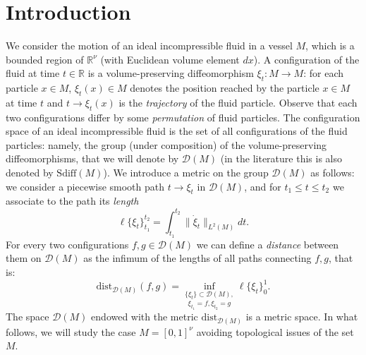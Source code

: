\documentclass[12 pt]{article}
\theoremstyle{definition} \newtheorem{definition}{Definition}[section]
\theoremstyle{definition} \newtheorem{remark}[definition]{Remark}
\theoremstyle{plain} \newtheorem{lemma}[definition]{Lemma}
\theoremstyle{plain} \newtheorem{proposition}[definition]{Proposition}
\theoremstyle{plain} \newtheorem{theorem}[definition]{Theorem}
\theoremstyle{plain} \newtheorem{corollary}[definition]{Corollary}
\theoremstyle{definition} \newtheorem{example}[definition]{Example}
\theoremstyle{definition} \newtheorem{assumption}[definition]{Assumption}
\theoremstyle{definition} \newtheorem{conjecture}[definition]{Conjecture}
\newcommand{\R}{\mathbb{R}}
\newcommand{\1}{\mathbbm 1}
\numberwithin{equation}{section}
\begin{document}
\section{Introduction}
We consider the motion of an ideal incompressible fluid in a vessel $M$, which is a bounded region of $\R^\nu$ (with Euclidean volume element $dx$). A configuration of the fluid at time $t\in\R$ is a volume-preserving diffeomorphism $\xi_t:M\rightarrow M$: for each particle $x\in M$, $\xi_t(x)\in M$ denotes the position reached by the particle  $x\in M$ at time $t$ and $t\rightarrow \xi_t(x)$ is the \emph{trajectory} of the fluid particle. Observe that each two configurations differ by some \emph{permutation} of fluid particles. The configuration space of an ideal incompressible fluid is the set of all configurations of the fluid particles: namely, the group (under composition) of the volume-preserving diffeomorphisms, that we will denote by $\mathcal{D}(M)$ (in the literature this is also denoted by $\text{Sdiff}(M)$). We introduce a metric on the group $\mathcal{D}(M)$ as follows: we consider a piecewise smooth path $t\rightarrow \xi_t$ in $\mathcal{D}(M)$, and for $t_1\leq t\leq t_2$ we associate to the path its \emph{length}
\begin{equation}\label{def:length:functional:cont}
    \mathcal{\ell}\lbrace\xi_t\rbrace_{t_1}^{t_2}=\int_{t_1}^{t_2} \|\dot\xi_t\|_{L^2(M)}dt.
\end{equation}
For every two configurations $f,g\in\mathcal{D}(M)$ we can define a \emph{distance} between them on $\mathcal{D}(M)$ as the infimum of the lengths of all paths connecting $f,g$, that is:
\begin{equation}\label{eq:distance}
    \text{dist}_{\mathcal{D}(M)}(f,g)=\underset{ \xi_{t_1}=f,\xi_{t_2}=g}{\inf_{\lbrace \xi_t\rbrace\subset\mathcal{D}(M), }} \ell\lbrace \xi_t\rbrace_0^1.
\end{equation}
The space $\mathcal{D}(M)$ endowed with the metric $\text{dist}_{\mathcal{D}(M)}$ is a metric space. In what follows, we will study the case $M=[0,1]^\nu$ avoiding topological issues of the set $M$. 

\medskip
\end{document}
